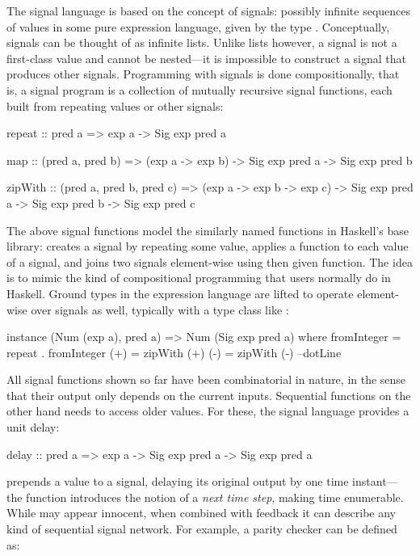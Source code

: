 \documentclass[../paper.tex]{subfiles}
\begin{document}
The signal language is based on the concept of signals: possibly infinite sequences of values in some pure expression language, given by the type . Conceptually, signals can be thought of as infinite lists. Unlike lists however, a signal is not a first-class value and cannot be nested---it is impossible to construct a signal that produces other signals. Programming with signals is done compositionally, that is, a signal program is a collection of mutually recursive signal functions, each built from repeating values or other signals:

\begin{code}
repeat :: pred a => exp a -> Sig exp pred a

map :: (pred a, pred b) => (exp a -> exp b) ->
  Sig exp pred a -> Sig exp pred b

zipWith :: (pred a, pred b, pred c) => (exp a -> exp b -> exp c) ->
  Sig exp pred a -> Sig exp pred b -> Sig exp pred c
\end{code}

The above signal functions model the similarly named functions in Haskell's base library:  creates a signal by repeating some value,  applies a function to each value of a signal, and  joins two signals element-wise using then given function. The idea is to mimic the kind of compositional programming that users normally do in Haskell. Ground types in the expression language are lifted to operate element-wise over signals as well, typically with a type class like :

\begin{code}
instance (Num (exp a), pred a) => Num (Sig exp pred a) where
  fromInteger = repeat . fromInteger
  (+)         = zipWith (+)
  (-)         = zipWith (-)
  --dotLine
\end{code}

All signal functions shown so far have been combinatorial in nature, in the sense that their output only depends on the current inputs. Sequential functions on the other hand needs to access older values. For these, the signal language provides a unit delay:

\begin{code}
delay :: pred a => exp a -> Sig exp pred a -> Sig exp pred a
\end{code}

\noindent {} prepends a value to a signal, delaying its original output by one time instant---the function introduces the notion of a \emph{next time step}, making time enumerable. While  may appear innocent, when combined with feedback it can describe any kind of sequential signal network. For example, a parity checker can be defined as:
\end{document}
